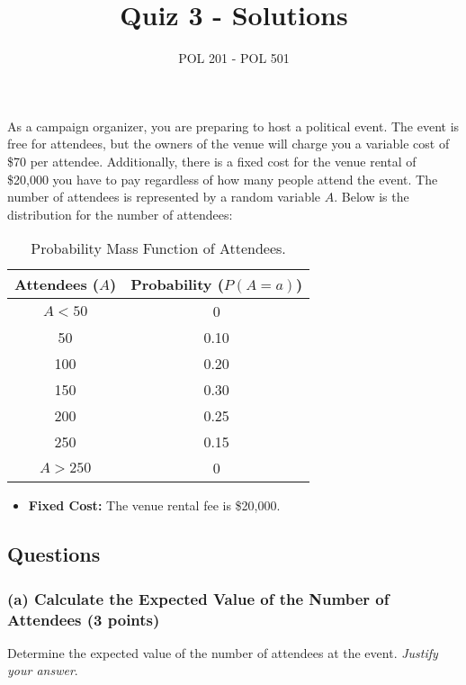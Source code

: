 \documentclass{article}
\title{Quiz 3 - Solutions}
\author{POL 201 - POL 501}
\date{}
\begin{document}
\maketitle

As a campaign organizer, you are preparing to host a political event. The event is free for attendees, but the owners of the venue will charge you a variable cost of \$70 per attendee. Additionally, there is a fixed cost for the venue rental of \$20,000 you have to pay regardless of how many people attend the event. The number of attendees is represented by a random variable $A$. Below is the distribution for the number of attendees:

\begin{table}[h!]
\centering
\begin{tabular}{c|c}
    \hline
    Attendees ($A$) & Probability ($P(A = a)$) \\
    \hline
    $A < 50$ & 0 \\
    50 & 0.10 \\
    100 & 0.20 \\
    150 & 0.30 \\
    200 & 0.25 \\
    250 & 0.15 \\
    $A > 250$ & 0 \\
    \hline
\end{tabular}
\caption{Probability Mass Function of Attendees.}
\end{table}
\begin{itemize}
    \item \textbf{Fixed Cost:} The venue rental fee is \$20,000.
\end{itemize}

\subsection*{Questions}

\subsubsection*{(a) Calculate the Expected Value of the Number of Attendees (3 points)}

Determine the expected value of the number of attendees at the event. \emph{Justify your answer}.

\begin{center}
\end{center}
\end{document}
